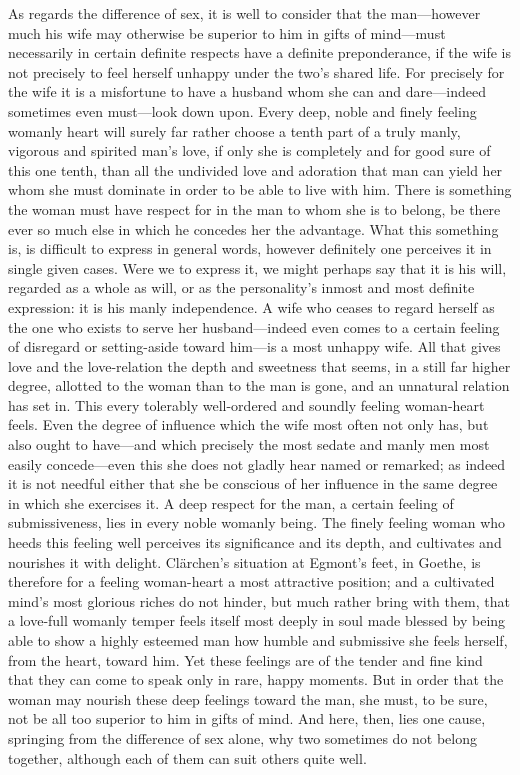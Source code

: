\documentclass[12pt,a4paper]{book}
\begin{document}
As regards the difference of sex, it is well to consider that the
man---however much his wife may otherwise be superior to him in gifts of
mind---must necessarily in certain definite respects have a definite
preponderance, if the wife is not precisely to feel herself unhappy under
the two's shared life. For precisely for the wife it is a misfortune to
have a husband whom she can and dare---indeed sometimes even must---look down
upon. Every deep, noble and finely feeling womanly heart will surely far
rather choose a tenth part of a truly manly, vigorous and spirited man's
love, if only she is completely and for good sure of this one tenth, than
all the undivided love and adoration that man can yield her whom she must
dominate in order to be able to live with him. There is something the woman
must have respect for in the man to whom she is to belong, be there ever so
much else in which he concedes her the advantage. What this something is,
is difficult to express in general words, however definitely one perceives
it in single given cases. Were we to express it, we might perhaps say that
it is his will, regarded as a whole as will, or as the personality's inmost
and most definite expression: it is his manly independence. A wife who
ceases to regard herself as the one who exists to serve her husband---indeed
even comes to a certain feeling of disregard or setting-aside toward
him---is a most unhappy wife. All that gives love and the love-relation the
depth and sweetness that seems, in a still far higher degree, allotted to
the woman than to the man is gone, and an unnatural relation has set in.
This every tolerably well-ordered and soundly feeling woman-heart feels.
Even the degree of influence which the wife most often not only has, but
also ought to have---and which precisely the most sedate and manly men most
easily concede---even this she does not gladly hear named or remarked; as
indeed it is not needful either that she be conscious of her influence in
the same degree in which she exercises it. A deep respect for the man, a
certain feeling of submissiveness, lies in every noble womanly being. The
finely feeling woman who heeds this feeling well perceives its significance
and its depth, and cultivates and nourishes it with delight. Clärchen's
situation at Egmont's feet, in Goethe, is therefore for a feeling
woman-heart a most attractive position; and a cultivated mind's most
glorious riches do not hinder, but much rather bring with them, that a
love-full womanly temper feels itself most deeply in soul made blessed by
being able to show a highly esteemed man how humble and submissive she
feels herself, from the heart, toward him. Yet these feelings are of the
tender and fine kind that they can come to speak only in rare, happy
moments. But in order that the woman may nourish these deep feelings toward
the man, she must, to be sure, not be all too superior to him in gifts of
mind. And here, then, lies one cause, springing from the difference of sex
alone, why two sometimes do not belong together, although each of them can
suit others quite well.
\end{document}
